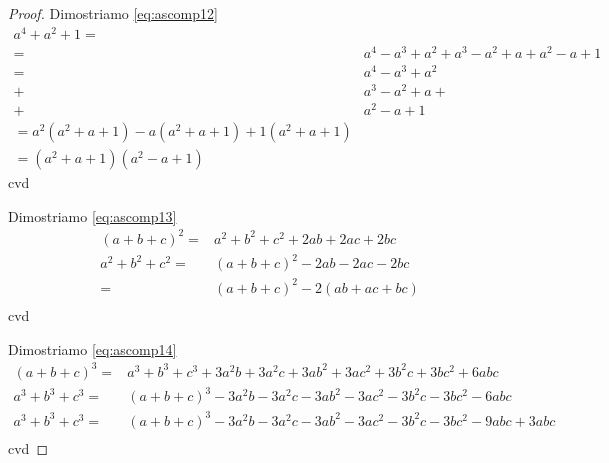 \begin{proof}
Dimostriamo \ref{eq:ascomp12}
\begin{align*}
a^4+a^2+1=&\\
=&a^4-a^3+a^2+a^3-a^2+a+a^2-a+1\\
=&a^4-a^3+a^2\\
+&a^3-a^2+a+\\
+&a^2-a+1\\
=a^2(a^2+a+1)-a(a^2+a+1)+1(a^2+a+1)\\
=(a^2+a+1)(a^2-a+1)
\end{align*}
cvd

Dimostriamo \ref{eq:ascomp13}
\begin{align*}
(a+b+c)^2=&a^2+b^2+c^2+2ab+2ac+2bc\\
a^2+b^2+c^2=&(a+b+c)^2-2ab-2ac-2bc\\
=&(a+b+c)^2-2(ab+ac+bc)\\
\end{align*}
cvd

Dimostriamo \ref{eq:ascomp14}
\begin{align*}
	(a+b+c)^3=&a^3+b^3+c^3+3a^2b+3a^2c+3ab^2+3ac^2+3b^2c+3bc^2+6abc\\
	a^3+b^3+c^3=&(a+b+c)^3-3a^2b-3a^2c-3ab^2-3ac^2-3b^2c-3bc^2-6abc\\
	a^3+b^3+c^3=&(a+b+c)^3-3a^2b-3a^2c-3ab^2-3ac^2-3b^2c-3bc^2-9abc+3abc\\
\end{align*}
cvd
\end{proof}
